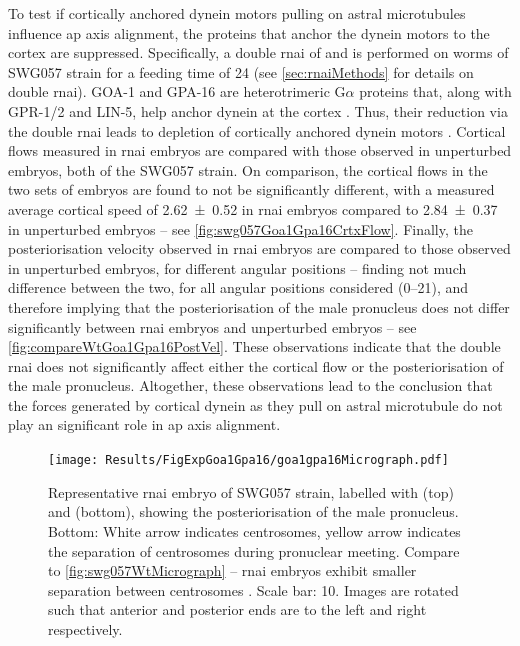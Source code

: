 To test if cortically anchored dynein motors pulling on astral microtubules influence \ac{ap} axis alignment, the proteins that anchor the dynein motors to the cortex are suppressed. Specifically, a double \ac{rnai} of  and  is performed on worms of SWG057 strain for a feeding time of \SI{24}{\unitRNAiTime} (see \autoref{sec:rnaiMethods} for details on double \ac{rnai}). GOA-1 and GPA-16 are heterotrimeric G$\alpha$ proteins that, along with GPR-1/2 and LIN-5, help anchor dynein at the cortex \citep{de2016dynein,nguyen2007coupling,colombo2003translation}. Thus, their reduction via the double \ac{rnai} leads to depletion of cortically anchored dynein motors \citep{de2016dynein}. Cortical flows measured in  \ac{rnai} embryos are compared with those observed in unperturbed embryos, both of the SWG057 strain. On comparison, the cortical flows in the two sets of embryos are found to not be significantly different, with a measured average cortical speed of \SI{2.62 +- 0.52}{\unitCrtxVel} in  \ac{rnai} embryos compared to \SI{2.84 +- 0.37}{\unitCrtxVel} in unperturbed embryos -- see \autoref{fig:swg057Goa1Gpa16CrtxFlow}. Finally, the posteriorisation velocity observed in  \ac{rnai} embryos are compared to those observed in unperturbed embryos, for different angular positions -- finding not much difference between the two, for all angular positions considered (\SIrange{0}{21}{\unitAngle}), and therefore implying that the posteriorisation of the male pronucleus does not differ significantly between  \ac{rnai} embryos and unperturbed embryos -- see \autoref{fig:compareWtGoa1Gpa16PostVel}. These observations indicate that the double \ac{rnai}  does not significantly affect either the cortical flow or the posteriorisation of the male pronucleus. Altogether, these observations lead to the conclusion that the forces generated by cortical dynein as they pull on astral microtubule do not play an significant role in \ac{ap} axis alignment.

\begin{figure}
\centering
\texttt{[image: Results/FigExpGoa1Gpa16/goa1gpa16Micrograph.pdf]}
\caption[Representative micrograph:  \acs{rnai} embryos of SWG057 strain]{Representative  \acs{rnai} embryo of SWG057 strain, labelled with  (top) and  (bottom), showing the posteriorisation of the male pronucleus. Bottom: White arrow indicates centrosomes, yellow arrow indicates the separation of centrosomes during pronuclear meeting. Compare to \autoref{fig:swg057WtMicrograph} --  \ac{rnai} embryos exhibit smaller separation between centrosomes \citep{de2016dynein}. Scale bar: \SI{10}{\unitLength}. Images are rotated such that anterior and posterior ends are to the left and right respectively.}
\label{fig:swg057Goa1Gpa16Micrograph}
\end{figure}

